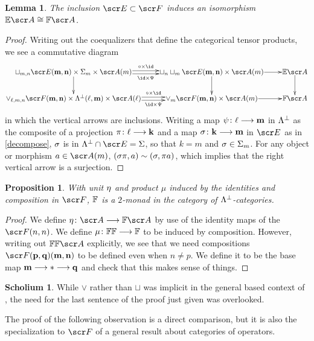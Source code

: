 \documentclass{amsart}
\newtheorem{prop}{Proposition}[section]
\newtheorem{lem}{Lemma}[section]
\theoremstyle{definition}
\newtheorem{sch}{Scholium}[section]
\numberwithin{equation}{section}
\newcommand{\bk}{\mathbf{k}}
\newcommand{\bm}{\mathbf{m}}
\newcommand{\bn}{\mathbf{n}}
\newcommand{\bp}{\mathbf{p}}
\newcommand{\bq}{\mathbf{q}}
\begin{document}
\begin{lem}\label{EinF}  The inclusion $\sE\subset \sF$ induces  an isomorphism $\bE\sA \iso \bF\sA$. 
\end{lem}
\begin{proof} Writing out the coequalizers that define the categorical tensor products, we see a commutative diagram
\[
\xymatrix@1{  
\sqcup_{m,n} \sE(\bm,\bn)\times \SI_m \times \sA(m) \ar@<.5ex> [r]^-{\com \times \id}  \ar@<-.5ex>[r]_-{\id\times \Psi} \ar[d] &  \sqcup_n\sqcup_m \sE(\bm,\bn)\times\sA(m)   \ar[r]  \ar[d] & \bE\sA \ar[d]\\ 
\vee_{\ell, m, n} \sF(\bm,\bn)\times \LA^{\perp}(\ell, \bm) \times \sA(\ell) \ar@<.5ex> [r]^-{\com\times \id}  \ar@<-.5ex>[r]_-{\id\times \Psi}  & \vee_{m} \sF(\bm,\bn)\times \sA(m)  \ar[r]  &  \bF\sA \\ }
\]
in which the vertical arrows are inclusions.    Writing a map $\ps\colon \ell \rtarr \bm$ in $\Lambda^{\perp}$ as the composite of a projection $\pi\colon \ell \rtarr \bk$ and a map $\si\colon \bk\rtarr \bm$ in $\sE$ as in 
\autoref{decompose}, $\sigma$ is in $\LA^{\perp}\cap \sE = \SI$, so that $k=m$ and $\sigma\in \Sigma_m$.  For any object or morphism $a\in \sA(m)$,  $(\sigma\pi, a) \sim (\sigma, \pi a)$, which implies that the right vertical arrow is a surjection.
\end{proof}

\begin{prop}\label{MonF}  With unit $\eta$ and product $\mu$ induced by the identities and composition in $\sF$, $\mathbb{F}$ is a $2$-monad in the category of $\Lambda^{\perp}$-categories.
\end{prop}
\begin{proof}  We define $\et\colon \sA \rtarr \bF \sA$ by use of the identity maps of the$\sF(n,n)$. 
We define $\mu\colon \mathbb{F}\mathbb{F} \longrightarrow \mathbb{F}$ to be induced by composition. However, writing out $\bF\bF\sA$ explicitly, we see that we need compositions $\sF(\bp, \bq)(\bm,\bn)$ to be defined even when $n\neq p$.
We define it to be the base map $\bm\rtarr \ast \rtarr \bq$ and check that this makes sense of things.
 \end{proof}
 
 \begin{sch} While $\vee$ rather than $\sqcup$ was implicit in the general based context of 
 \cite[Section 4]{GMMO2}, the need for the last sentence of the proof just given was overlooked.
 \end{sch}
 
The proof of the following observation is a direct comparison, but it is also the specialization to $\sF$ of a general result about categories of operators.  
 
\end{document}

